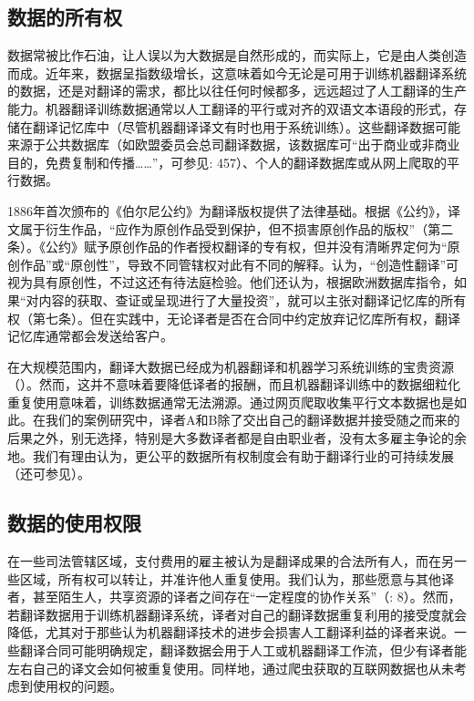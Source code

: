 \documentclass[output=paper]{langscibook}
\begin{document}
\subsection{数据的所有权}\label{sec:moorkens:2.2}\largerpage

数据常被比作石油，让人误以为大数据是自然形成的，而实际上，它是由人类创造而成。近年来，数据呈指数级增长，这意味着如今无论是可用于训练机器翻译系统的数据，还是对翻译的需求，都比以往任何时候都多，远远超过了人工翻译的生产能力。机器翻译训练数据通常以人工翻译的平行或对齐的双语文本语段的形式，存储在翻译记忆库中（尽管机器翻译译文有时也用于系统训练）。这些翻译数据可能来源于公共数据库（如欧盟委员会总司翻译数据，该数据库可“出于商业或非商业目的，免费复制和传播……”，可参见\citealt{SteinbergerSchlüter2012}: 457）、个人的翻译数据库或从网上爬取的平行数据。

1886年首次颁布的《伯尔尼公约》为翻译版权提供了法律基础。根据《公约》，译文属于衍生作品，“应作为原创作品受到保护，但不损害原创作品的版权”（\citealt{WIPO1979}第二条）。《公约》赋予原创作品的作者授权翻译的专有权，但并没有清晰界定何为“原创作品”或“原创性”，导致不同管辖权对此有不同的解释。\citet{TrousselDebussche2014}认为，“创造性翻译”可视为具有原创性，不过这还有待法庭检验。他们还认为，根据欧洲数据库指令，如果“对内容的获取、查证或呈现进行了大量投资”，就可以主张对翻译记忆库的所有权（\citealt{EuropeanParliament1996}第七条）。但在实践中，无论译者是否在合同中约定放弃记忆库所有权，翻译记忆库通常都会发送给客户。

在大规模范围内，翻译大数据已经成为机器翻译和机器学习系统训练的宝贵资源（\citealt{MoorkensLewis2019}）。然而，这并不意味着要降低译者的报酬，而且机器翻译训练中的数据细粒化重复使用意味着，训练数据通常无法溯源。通过网页爬取收集平行文本数据也是如此。在我们的案例研究中，译者A和B除了交出自己的翻译数据并接受随之而来的后果之外，别无选择，特别是大多数译者都是自由职业者，没有太多雇主争论的余地。我们有理由认为，更公平的数据所有权制度会有助于翻译行业的可持续发展（还可参见）。  


\subsection{数据的使用权限} \label{sec:moorkens:2.3}

在一些司法管辖区域，支付费用的雇主被认为是翻译成果的合法所有人，而在另一些区域，所有权可以转让，并准许他人重复使用。我们认为，那些愿意与其他译者，甚至陌生人，共享资源的译者之间存在“一定程度的协作关系”（\citealt{MoorkensLewis2019Jostrans}: 8）。然而，若翻译数据用于训练机器翻译系统，译者对自己的翻译数据重复利用的接受度就会降低，尤其对于那些认为机器翻译技术的进步会损害人工翻译利益的译者来说。一些翻译合同可能明确规定，翻译数据会用于人工或机器翻译工作流，但少有译者能左右自己的译文会如何被重复使用。同样地，通过爬虫获取的互联网数据也从未考虑到使用权的问题。
\end{document}
